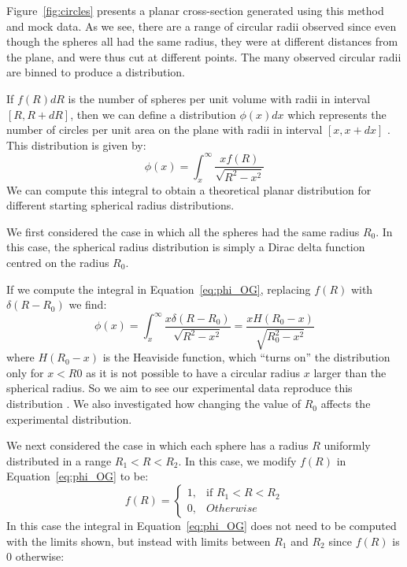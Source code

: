 \documentclass[journal]{IEEEtran}
\begin{document}
Figure~\ref{fig:circles} presents a planar cross-section generated using this
method and mock data. As we see, there are a range of circular radii observed
since even though the spheres all had the same radius, they were at different
distances from the plane, and were thus cut at different points. The many
observed circular radii are binned to produce a distribution.

If $f(R)dR$ is the number of spheres per unit volume with radii in interval $[R,
R + dR]$, then we can define a distribution $\phi(x)dx$ which represents the
number of circles per unit area on the plane with radii in interval $[x,
x+dx]$ \cite{Kiderlen2011}. This distribution is given by:
\begin{equation}
\phi(x) = \int_{x}^{\infty}\frac{xf(R)}{\sqrt{R^2 - x^2}}
\label{eq:phi_OG}
\end{equation}
We can compute this integral to obtain a theoretical planar distribution for
different starting spherical radius distributions.

We first considered the case in which all the spheres had the same radius
$R_0$. In this case, the spherical radius distribution is simply a Dirac delta
function centred on the radius $R_0$.

If we compute the integral in Equation~\ref{eq:phi_OG}, replacing $f(R)$ with
$\delta(R-R_0)$ we find:
\begin{equation}
\phi(x) = \int_{x}^{\infty}\frac{x\delta(R-R_0)}{\sqrt{R^2 - x^2}} =
\frac{xH(R_0-x)}{\sqrt{R_0^2-x^2}}
\label{eq:phi_constant}
\end{equation}
where $H(R_0 - x)$ is the Heaviside function, which ``turns on'' the
distribution only for $x < R0$ as it is not possible to have a circular radius
$x$ larger than the spherical radius. So we aim to see our experimental data
reproduce this distribution \cite{Kong2005}. We also investigated how changing the
value of $R_0$ affects the experimental distribution.

We next considered the case in which each sphere has a radius $R$ uniformly
distributed in a range $R_1 < R < R_2$. In this case, we modify $f(R)$ in
Equation~\ref{eq:phi_OG} to be:
\begin{equation*}
  f(R) =
  \begin{cases}
    1,& \text{if } R_1 < R < R_2\\
    0,& \text{} Otherwise
  \end{cases}
\end{equation*}
In this case the integral in Equation~\ref{eq:phi_OG} does not need to be
computed with the limits shown, but instead with limits between $R_1$ and $R_2$
since $f(R)$ is 0 otherwise:
\end{document}
